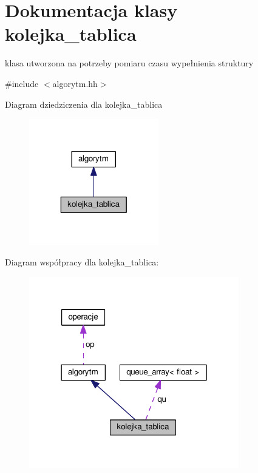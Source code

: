 \hypertarget{classkolejka__tablica}{\section{Dokumentacja klasy kolejka\-\_\-tablica}
\label{classkolejka__tablica}
}


klasa utworzona na potrzeby pomiaru czasu wypełnienia struktury  




{\ttfamily \#include $<$algorytm.\-hh$>$}



Diagram dziedziczenia dla kolejka\-\_\-tablica\nopagebreak
\begin{figure}[H]
\begin{center}
\leavevmode
\includegraphics[width=160pt]{classkolejka__tablica__inherit__graph}
\end{center}
\end{figure}


Diagram współpracy dla kolejka\-\_\-tablica\-:\nopagebreak
\begin{figure}[H]
\begin{center}
\leavevmode
\includegraphics[width=259pt]{classkolejka__tablica__coll__graph}
\end{center}
\end{figure}
